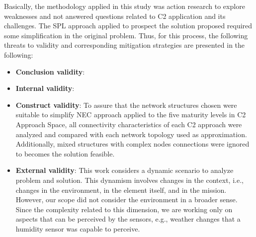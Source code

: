 
Basically, the methodology applied in this study was action research to explore weaknesses and not answered questions related to C2 application and its challenges. The SPL approach applied to prospect the solution proposed required some simplification in the original problem. Thus, for this process, the following threats to validity and corresponding mitigation strategies are presented in the following: 

\begin{itemize}
   \item \textbf{Conclusion validity}: 
   
   \item \textbf{Internal validity}: 
   
   \item \textbf{Construct validity}: To assure that the network structures chosen were suitable to simplify NEC approach applied to the five maturity levels in C2 Approach Space, all connectivity characteristics of each C2 approach were analyzed and compared with each network topology used as approximation. Additionally, mixed structures with complex nodes connections were ignored to becomes the solution feasible.
   
   
   \item \textbf{External validity}: This work considers a dynamic scenario to analyze problem and solution. This dynamism involves changes in the context, i.e., changes in the environment, in the element itself, and in the mission. However, our scope did not consider the environment in a broader sense. Since the complexity related to this dimension, we are working only on aspects that can be perceived by the sensors, e.g., weather changes that a humidity sensor was capable to perceive.
\end{itemize}